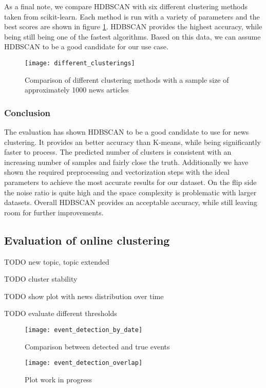 As a final note, we compare HDBSCAN with six different clustering methods taken from scikit-learn. Each method is run with a variety of parameters and the best scores are shown in figure \ref{fig:different_clusterings}. HDBSCAN provides the highest accuracy, while being still being one of the fastest algorithms. Based on this data, we can assume HDBSCAN to be a good candidate for our use case.

\begin{figure}[h]
    \centering
    \texttt{[image: different\_clusterings]}
    \caption{Comparison of different clustering methods with a sample size of approximately 1000 news articles}
    \label{fig:different_clusterings}
\end{figure}

\subsubsection{Conclusion}

The evaluation has shown HDBSCAN to be a good candidate to use for news clustering. It provides an better accuracy than K-means, while being significantly faster to process. The predicted number of clusters is consistent with an increasing number of samples and fairly close the truth. Additionally we have shown the required preprocessing and vectorization steps with the ideal parameters to achieve the most accurate results for our dataset. On the flip side the noise ratio is quite high and the space complexity is problematic with larger datasets. Overall HDBSCAN provides an acceptable accuracy, while still leaving room for further improvements.

\subsection{Evaluation of online clustering}

TODO new topic, topic extended

TODO cluster stability

TODO show plot with news distribution over time

TODO evaluate different thresholds

\begin{figure}[h]
    \centering
    \texttt{[image: event\_detection\_by\_date]}
    \caption{Comparison between detected and true events}
    \label{fig:event_detection_by_date}
\end{figure}

\begin{figure}[h]
    \centering
    \texttt{[image: event\_detection\_overlap]}
    \caption{Plot work in progress}
    \label{fig:event_detection_overlap}
\end{figure}

